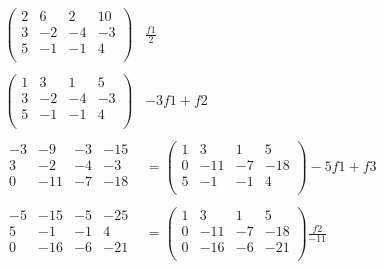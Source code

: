 \[
    \begin{aligned}
        \left(
            \begin{array}{ccc|c}
                2 & 6 & 2 & 10 \\
                3 & -2 & -4 & -3 \\
                5 & -1 & -1 & 4 \\
            \end{array}
        \right)
        & \frac{f1}{2} \\ \\
        \left(
            \begin{array}{ccc|c}
                1 & 3 & 1 & 5 \\
                3 & -2 & -4 & -3 \\
                5 & -1 & -1 & 4 \\
            \end{array}
        \right)
        & -3f1+f2 \\ \\
        \begin{array}{ccc|c}
            -3 & -9 & -3 & -15 \\
            3 & -2 & -4 & -3 \\
            \hline
            0 & -11 & -7 & -18 \\
        \end{array}
        & = 
        \left(
            \begin{array}{ccc|c}
                1 & 3 & 1 & 5 \\
                0 & -11 & -7 & -18 \\
                5 & -1 & -1 & 4 \\
            \end{array}
        \right)
        -5f1+f3 \\ \\
        \begin{array}{ccc|c}
            -5 & -15 & -5 & -25 \\
            5 & -1 & -1 & 4 \\
            \hline
            0 & -16 & -6 & -21 \\
        \end{array}
        & = 
        \left(
            \begin{array}{ccc|c}
                1 & 3 & 1 & 5 \\
                0 & -11 & -7 & -18 \\
                0 & -16 & -6 & -21 \\
            \end{array}
        \right)
        \frac{f2}{-11} \\ \\
    \end{aligned}
\]

